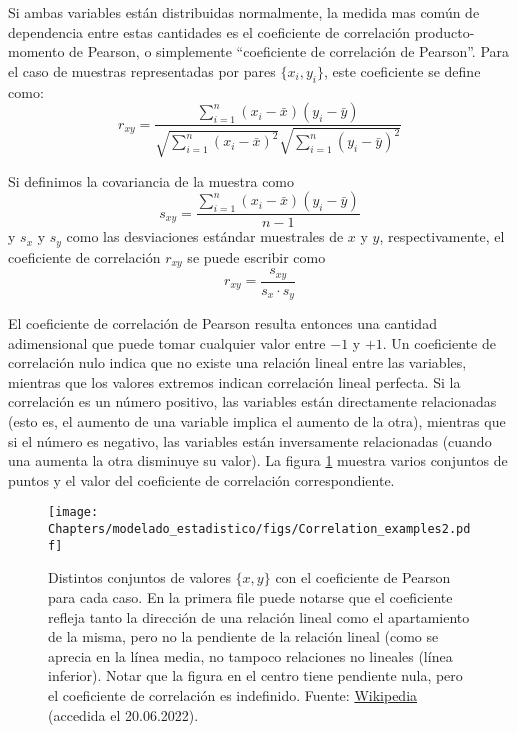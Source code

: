 Si ambas variables están distribuidas normalmente, la medida mas común de dependencia entre estas cantidades es el coeficiente de correlación producto-momento de Pearson, o simplemente ``coeficiente de correlación de Pearson''. Para el caso de muestras representadas por pares $\{x_i, y_i\}$, este coeficiente se define como:
\[ r_{xy} =\frac{\sum\limits_{i=1}^n{(x_i - \bar{x})(y_i - \bar{y})}} {\sqrt{\sum\limits_{i=1}^n(x_i - \bar{x})^2} \sqrt{\sum\limits_{i=1}^n(y_i - \bar{y})^2}}  \]

Si definimos la covariancia de la muestra como
\[ s_{xy} = \frac{\sum\limits_{i=1}^n {(x_i - \bar{x}) (y_i - \bar{y})}} {n - 1}  \]
y $s_x$ y $s_y$ como las desviaciones estándar muestrales de $x$ y $y$, respectivamente, el coeficiente de correlación $r_{xy}$ se puede escribir como
\[ r_{xy} = \frac{s_{xy}}{s_x \cdot s_y}  \]

El coeficiente de correlación de Pearson resulta entonces una cantidad adimensional que puede tomar cualquier valor entre $-1$ y $+1$. Un coeficiente de correlación nulo indica que no existe una relación lineal entre las variables, mientras que los valores extremos indican correlación lineal perfecta. Si la correlación es un número positivo, las variables están directamente relacionadas (esto es, el aumento de una variable implica el aumento de la otra), mientras que si el número es negativo, las variables están inversamente relacionadas (cuando una aumenta la otra disminuye su valor). La figura \ref{fig:me-pearson} muestra varios conjuntos de puntos y el valor del coeficiente de correlación correspondiente.

\begin{figure}[t]
 \centering
 \texttt{[image: Chapters/modelado\_estadistico/figs/Correlation\_examples2.pdf]}
 \caption{Distintos conjuntos de valores $\{x, y\}$ con el coeficiente de Pearson para cada caso. En la primera file puede notarse que el coeficiente refleja tanto la dirección de una relación lineal como el apartamiento de la misma, pero no la pendiente de la relación lineal (como se aprecia en la línea media, no tampoco relaciones no lineales (línea inferior). Notar que la figura en el centro tiene pendiente nula, pero el coeficiente de correlación es indefinido. Fuente: \href{https://commons.wikimedia.org/w/index.php?curid=15165296}{Wikipedia} (accedida el 20.06.2022). }
 \label{fig:me-pearson}
\end{figure}


